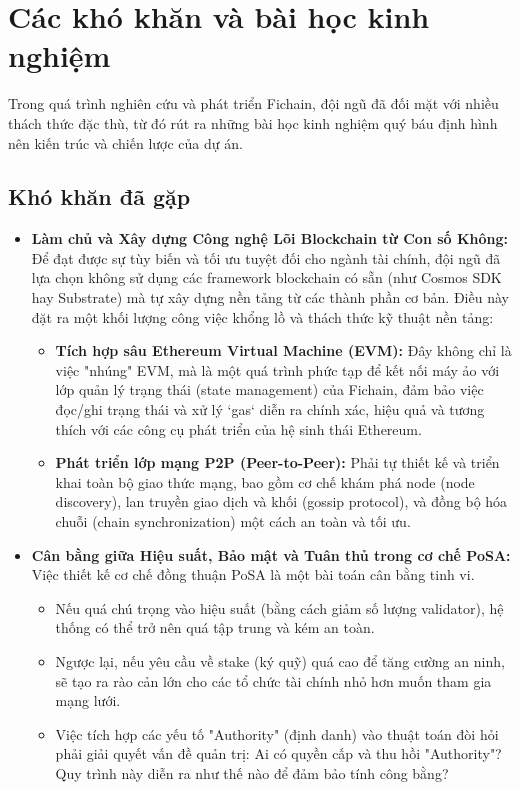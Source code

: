 \section{Các khó khăn và bài học kinh nghiệm}
Trong quá trình nghiên cứu và phát triển Fichain, đội ngũ đã đối mặt với nhiều thách thức đặc thù, từ đó rút ra những bài học kinh nghiệm quý báu định hình nên kiến trúc và chiến lược của dự án.

\subsection{Khó khăn đã gặp}
\begin{itemize}

     \item \textbf{Làm chủ và Xây dựng Công nghệ Lõi Blockchain từ Con số Không:}
       Để đạt được sự tùy biến và tối ưu tuyệt đối cho ngành tài chính, đội ngũ đã lựa chọn không sử dụng các framework blockchain có sẵn (như Cosmos SDK\cite{kwon2016cosmos} hay Substrate\cite{substrate_docs}) mà tự xây dựng nền tảng từ các thành phần cơ bản. Điều này đặt ra một khối lượng công việc khổng lồ và thách thức kỹ thuật nền tảng:
    \begin{itemize}
        \item \textbf{Tích hợp sâu Ethereum Virtual Machine (EVM):} Đây không chỉ là việc "nhúng" EVM, mà là một quá trình phức tạp để kết nối máy ảo với lớp quản lý trạng thái (state management) của Fichain, đảm bảo việc đọc/ghi trạng thái và xử lý `gas` diễn ra chính xác, hiệu quả và tương thích với các công cụ phát triển của hệ sinh thái Ethereum.
        \item \textbf{Phát triển lớp mạng P2P (Peer-to-Peer):} Phải tự thiết kế và triển khai toàn bộ giao thức mạng, bao gồm cơ chế khám phá node (node discovery), lan truyền giao dịch và khối (gossip protocol), và đồng bộ hóa chuỗi (chain synchronization) một cách an toàn và tối ưu.
    \end{itemize}

    \item \textbf{Cân bằng giữa Hiệu suất, Bảo mật và Tuân thủ trong cơ chế PoSA:}
    Việc thiết kế cơ chế đồng thuận PoSA là một bài toán cân bằng tinh vi.
    \begin{itemize}
        \item Nếu quá chú trọng vào hiệu suất (bằng cách giảm số lượng validator), hệ thống có thể trở nên quá tập trung và kém an toàn.
        \item Ngược lại, nếu yêu cầu về stake (ký quỹ) quá cao để tăng cường an ninh, sẽ tạo ra rào cản lớn cho các tổ chức tài chính nhỏ hơn muốn tham gia mạng lưới.
        \item Việc tích hợp các yếu tố "Authority" (định danh) vào thuật toán đòi hỏi phải giải quyết vấn đề quản trị: Ai có quyền cấp và thu hồi "Authority"? Quy trình này diễn ra như thế nào để đảm bảo tính công bằng?
    \end{itemize}


\end{itemize}
